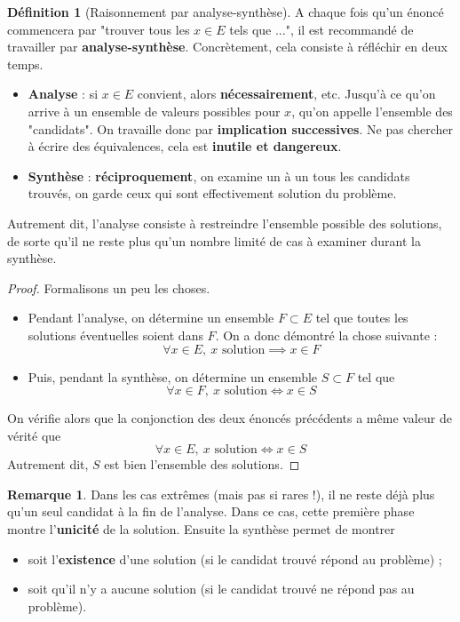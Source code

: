 \documentclass[french]{book}
\theoremstyle{plain}
\theoremstyle{definition}
\newtheorem{dfn}{Définition}[chapter]
\newtheorem{rmq}{Remarque}[chapter]
\theoremstyle{remark}
\begin{document}
\begin{dfn}[Raisonnement par analyse-synthèse]
	A chaque fois qu'un énoncé commencera par "trouver tous les $x\in E$ tels que ...", il est recommandé de travailler par \textbf{analyse-synthèse}. Concrètement, cela consiste à réfléchir en deux temps.
	\begin{itemize}
		\item \textbf{Analyse} : si $x\in E$ convient, alors \textbf{nécessairement}, etc. Jusqu'à ce qu'on arrive à un ensemble de valeurs possibles pour $x$, qu'on appelle l'ensemble des "candidats". On travaille donc par \textbf{implication successives}. Ne pas chercher à écrire des équivalences, cela est \textbf{inutile et dangereux}.
		\item \textbf{Synthèse} : \textbf{réciproquement}, on examine un à un tous les candidats trouvés, on garde ceux qui sont effectivement solution du problème.
	\end{itemize}
	Autrement dit, l'analyse consiste à restreindre l'ensemble possible des solutions, de sorte qu'il ne reste plus qu'un nombre limité de cas à examiner durant la synthèse.
\end{dfn}
\begin{proof}
	Formalisons un peu les choses.
	\begin{itemize}
		\item Pendant l'analyse, on détermine un ensemble $F\subset E$ tel que toutes les solutions éventuelles soient dans $F$. On a donc démontré la chose suivante : $$\forall x\in E,\ x\text{ solution}\implies x\in F$$
		\item Puis, pendant la synthèse, on détermine un ensemble $S\subset F$ tel que $$\forall x\in F,\ x\text{ solution}\iff x\in S$$
	\end{itemize}
	On vérifie alors que la conjonction des deux énoncés précédents a même valeur de vérité que $$\forall x\in E,\ x\text{ solution}\iff x\in S$$ Autrement dit, $S$ est bien l'ensemble des solutions.
\end{proof}
\begin{rmq}
	Dans les cas extrêmes (mais pas si rares !), il ne reste déjà plus qu'un seul candidat à la fin de l'analyse. Dans ce cas, cette première phase montre l'\textbf{unicité} de la solution. Ensuite la synthèse permet de montrer
	\begin{itemize}
		\item soit l'\textbf{existence} d'une solution (si le candidat trouvé répond au problème) ;
		\item soit qu'il n'y a aucune solution (si le candidat trouvé ne répond pas au problème).
	\end{itemize}
\end{rmq}
\end{document}
